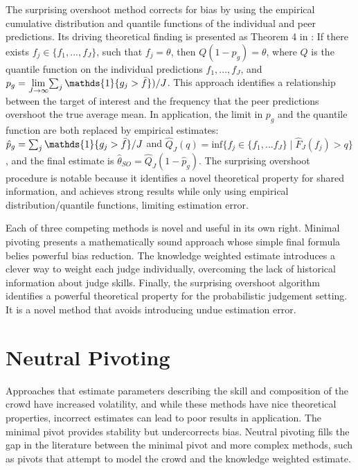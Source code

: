 The surprising overshoot method corrects for bias by using the empirical cumulative distribution and quantile functions of the individual and peer predictions. Its driving theoretical finding is presented as Theorem 4 in \cite{so}: If there exists $f_j \in \{f_1,...,f_J\}$, such that $f_j = \theta$, then $Q(1-p_g) = \theta$, where $Q$ is the quantile function on the individual predictions $f_1,...,f_J$, and  $p_g = \underset{J \rightarrow \infty}{\mathrm{lim}}{\sum_j\mathds{1}\{g_j > \Bar{f}\})}/J $. This approach identifies a relationship between the target of interest and the frequency that the peer predictions overshoot the true average mean. In application, the limit in $p_g$ and the quantile function are both replaced by empirical estimates: $\hat{p}_g = {\sum_j\mathds{1}\{g_j > \Bar{f}\}}/J$ and $\hat{Q}_J(q) = \mathrm{inf}\{f_j \in \{f_1,...f_J\}\mid \hat{F}_J(f_j) > q\}$, and the final estimate is $\hat{\theta}_{SO}=\hat{Q}_J(1- \hat{p}_g)$. The surprising overshoot procedure is notable because it identifies a novel theoretical property for shared information, and achieves strong results while only using empirical distribution/quantile functions, limiting estimation error. 

Each of three competing methods is novel and useful in its own right. Minimal pivoting presents a mathematically sound approach whose simple final formula belies powerful bias reduction. The knowledge weighted estimate introduces a clever way to weight each judge individually, overcoming the lack of historical information about judge skills. Finally, the surprising overshoot algorithm identifies a powerful theoretical property for the probabilistic judgement setting. It is a novel method that avoids introducing undue estimation error. 

\section{Neutral Pivoting}
\label{sec:NP}
Approaches that estimate parameters describing the skill and composition of the crowd have increased volatility, and while these methods have nice theoretical properties, incorrect estimates can lead to poor results in application. The minimal pivot provides stability but undercorrects bias. Neutral pivoting fills the gap in the literature between the minimal pivot and more complex methods, such as pivots that attempt to model the crowd and the knowledge weighted estimate.

